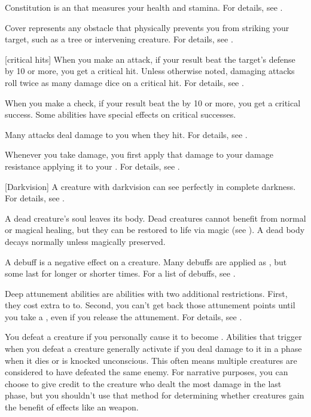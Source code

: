  Constitution is an  that measures your health and stamina.
For details, see .

 Cover represents any obstacle that physically prevents you from striking your target, such as a tree or intervening creature.
For details, see .

[critical hits] When you make an attack, if your result beat the target's defense by 10 or more, you get a critical hit.
Unless otherwise noted, damaging attacks roll twice as many damage dice on a critical hit.
For details, see .

 When you make a check, if your result beat the  by 10 or more, you get a critical success.
Some abilities have special effects on critical successes.

 Many attacks deal damage to you when they hit.
For details, see .

 Whenever you take damage, you first apply that damage to your damage resistance applying it to your .
For details, see .

[Darkvision] A creature with darkvision can see perfectly in complete darkness.
For details, see .

 A dead creature's soul leaves its body. Dead creatures cannot benefit from normal or magical healing, but they can be restored to life via magic (see ). A dead body decays normally unless magically preserved.

 A debuff is a negative effect on a creature.
Many debuffs are applied as , but some last for longer or shorter times.
For a list of debuffs, see .

 Deep attunement abilities are  abilities with two additional restrictions.
First, they cost extra  to  to.
Second, you can't get back those attunement points until you take a , even if you release the attunement.
For details, see .

 You defeat a creature if you personally cause it to become .
Abilities that trigger when you defeat a creature generally activate if you deal damage to it in a phase when it dies or is knocked unconscious.
This often means multiple creatures are considered to have defeated the same enemy.
For narrative purposes, you can choose to give credit to the creature who dealt the most damage in the last phase, but you shouldn't use that method for determining whether creatures gain the benefit of effects like an  weapon.


